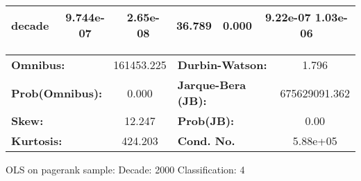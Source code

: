 \begin{center}
\begin{tabular}{lccccc}
\textbf{decade}             &    9.744e-07  &     2.65e-08     &    36.789  &         0.000        &      9.22e-07  1.03e-06       \\
\bottomrule
\end{tabular}
\begin{tabular}{lclc}
\textbf{Omnibus:}       & 161453.225 & \textbf{  Durbin-Watson:     } &       1.796    \\
\textbf{Prob(Omnibus):} &    0.000   & \textbf{  Jarque-Bera (JB):  } & 675629091.362  \\
\textbf{Skew:}          &   12.247   & \textbf{  Prob(JB):          } &        0.00    \\
\textbf{Kurtosis:}      &  424.203   & \textbf{  Cond. No.          } &    5.88e+05    \\
\bottomrule
\end{tabular}
\end{center}
\break
OLS on pagerank sample: Decade: 2000 Classification: 4
